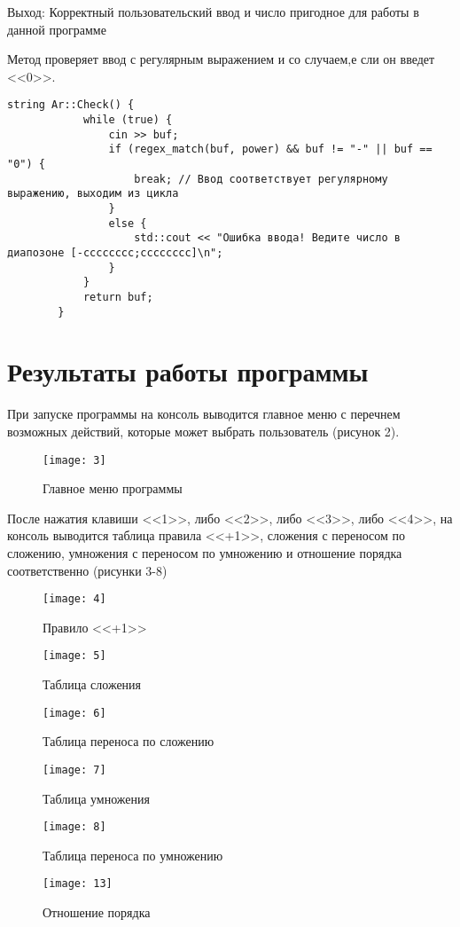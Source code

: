 \documentclass[10pt,a4paper,final]{article} %
\begin{document}
			Выход: Корректный пользовательский ввод и число пригодное для работы в данной программе
			
			Метод проверяет ввод с регулярным выражением и со случаем,е сли он введет <<0>>.
		
		\begin{lstlisting}[caption={Метод Check}]
		string Ar::Check() {
			while (true) {
				cin >> buf;
				if (regex_match(buf, power) && buf != "-" || buf == "0") {
					break; // Ввод соответствует регулярному выражению, выходим из цикла
				}
				else {
					std::cout << "Ошибка ввода! Ведите число в диапозоне [-cccccccc;cccccccc]\n";
				}
			}
			return buf;
		}
		\end{lstlisting}
		
		
		
		\newpage
			\section{Результаты работы программы}
			При запуске программы на консоль выводится главное меню с перечнем возможных действий, которые может выбрать пользователь (рисунок 2).
			
				\begin{figure}[h!]
				\centering
				\texttt{[image: 3]}
				\caption{Главное меню программы}
			\end{figure}
			
			После нажатия клавиши <<1>>, либо <<2>>, либо <<3>>, либо <<4>>, на консоль выводится таблица правила <<+1>>, сложения с переносом по сложению, умножения с переносом по умножению и отношение порядка соответственно (рисунки 3-8)  
			
					\begin{figure}[h!]
				\centering
				\texttt{[image: 4]}
				\caption{Правило <<+1>>}
			\end{figure}	
			\begin{figure}[h!]
			\centering
			\texttt{[image: 5]}
			\caption{Таблица сложения}
				\texttt{[image: 6]}
			\caption{Таблица переноса по сложению}
			\texttt{[image: 7]}
			\caption{Таблица умножения}
						\end{figure}
			\clearpage
				\begin{figure}[h!]
				\centering
				\texttt{[image: 8]}
				\caption{Таблица переноса по умножению}
				\texttt{[image: 13]}
				\caption{Отношение порядка}
			\end{figure}
			
\end{document}
